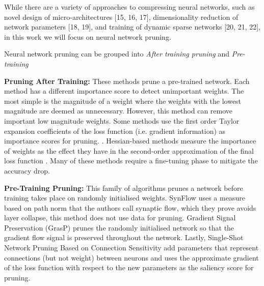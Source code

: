 While there are a variety of approaches to compressing neural networks, such as novel design of micro-architectures [15, 16, 17], dimensionality reduction of network parameters [18, 19], and training of dynamic sparse networks [20, 21, 22], in this work we will focus on neural network pruning.



Neural network pruning can be grouped into \textit{After training pruning}
and  \textit{Pre-training } 

\textbf{Pruning After Training:} These methods prune a pre-trained network.
Each method has a different importance score to detect unimportant weights.
The most simple is the magnitude of a weight
\cite{hanLearningBothWeights2015a,hanDeepCompressionCompressing2016a} where the
weights with the lowest magnitude are deemed as
 unnecessary. However, this method can remove important low magnitude weights.
 Some methods use the first order Taylor expansion coefficients of the  loss function (i.e. gradient information)  as importance scores for pruning. \cite{karninsimpleprocedurepruning1990a,mozerskeletonizationtechniquetrimming1988}.
 Hessian-based methods measure the importance of weights as the effect they
 have in the second-order approximation of the final loss function 
 \cite{hassibiSecondOrderDerivatives1992,lecunOptimalBrainDamage1989,
 hassibiOptimalBrainSurgeon1993,singhWoodFisherEfficientSecondOrder2020}.
 Many of these methods require a fine-tuning phase to mitigate the accuracy
 drop.




\textbf{Pre-Training Pruning:} This family of algorithms prunes a
network before training takes place on randomly initialised weights. SynFlow
\cite{tanakaPruningNeuralNetworks2020a} uses a measure based on path norm
\cite{neyshaburPathSGDPathNormalizedOptimization2015} that the authors call
synaptic flow, which they prove avoids layer collapse, this method does not use
data for pruning. Gradient Signal Preservation
(GrasP) \cite{wangPickingWinningTickets2020} prunes the randomly initialised network so that the
gradient flow signal is preserved throughout the network.
Lastly, Single-Shot Network Pruning Based on Connection Sensitivity
\cite{leeSNIPSINGLESHOTNETWORK2018} add parameters that represent
connections (but not weight) between neurons and uses the approximate
gradient of the loss function with respect to the new parameters as the
saliency score for pruning. 

